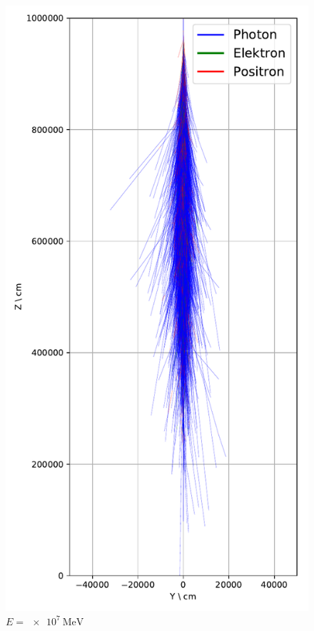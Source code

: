 \documentclass[aspectratio=1610, captions=tableheading, 11pt]{beamer}
\begin{document}
\begin{frame}
\begin{columns}
    \begin{column}{0.33\textwidth}
      \begin{figure}
          \centering
          \includegraphics[height=0.9\textheight]{shower_presentation/2d_shower_1e7.pdf}
          \caption*{$E = \SI{e7}{\mega\electronvolt}$}
      \end{figure}    \end{column}
  \end{columns}
\end{frame}
\end{document}
